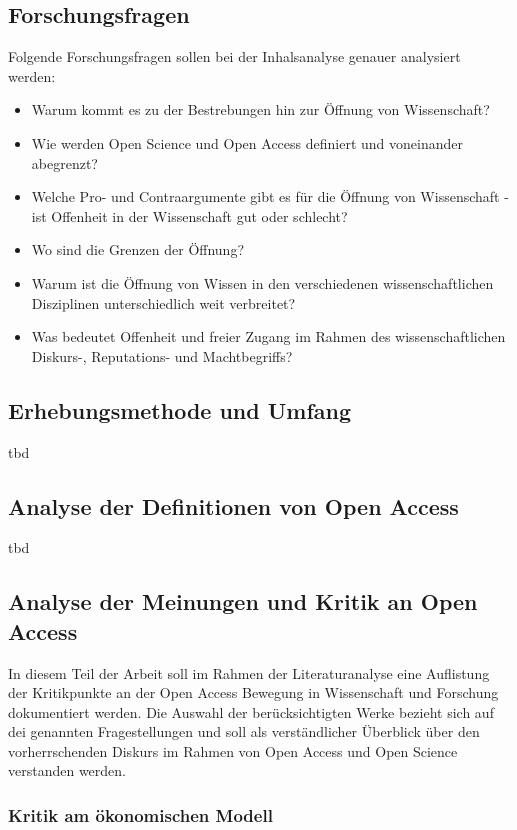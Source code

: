 \subsection{Forschungsfragen} 
Folgende Forschungsfragen sollen bei der Inhalsanalyse genauer analysiert werden:
\begin{itemize}
\item Warum kommt es zu der Bestrebungen hin zur Öffnung von Wissenschaft? 
\item Wie werden Open Science und Open Access definiert und voneinander abegrenzt? 
\item Welche Pro- und Contraargumente gibt es für die Öffnung von Wissenschaft - ist Offenheit in der Wissenschaft gut oder schlecht? 
\item Wo sind die Grenzen der Öffnung? 
\item Warum ist die Öffnung von Wissen in den verschiedenen wissenschaftlichen Disziplinen unterschiedlich weit verbreitet? 
\item Was bedeutet Offenheit und freier Zugang im Rahmen des wissenschaftlichen Diskurs-, Reputations- und Machtbegriffs?
\end{itemize}	

\subsection{Erhebungsmethode und Umfang} 
tbd

\subsection{Analyse der Definitionen von Open Access} 
tbd

\subsection{Analyse der Meinungen und Kritik an Open Access}

In diesem Teil der Arbeit soll im Rahmen der Literaturanalyse eine Auflistung der Kritikpunkte an der Open Access Bewegung in Wissenschaft und Forschung dokumentiert werden. Die Auswahl der berücksichtigten Werke bezieht sich auf dei genannten Fragestellungen und soll als verständlicher Überblick über den vorherrschenden Diskurs im Rahmen von Open Access und Open Science verstanden werden.

\subsubsection{Kritik am ökonomischen Modell}

